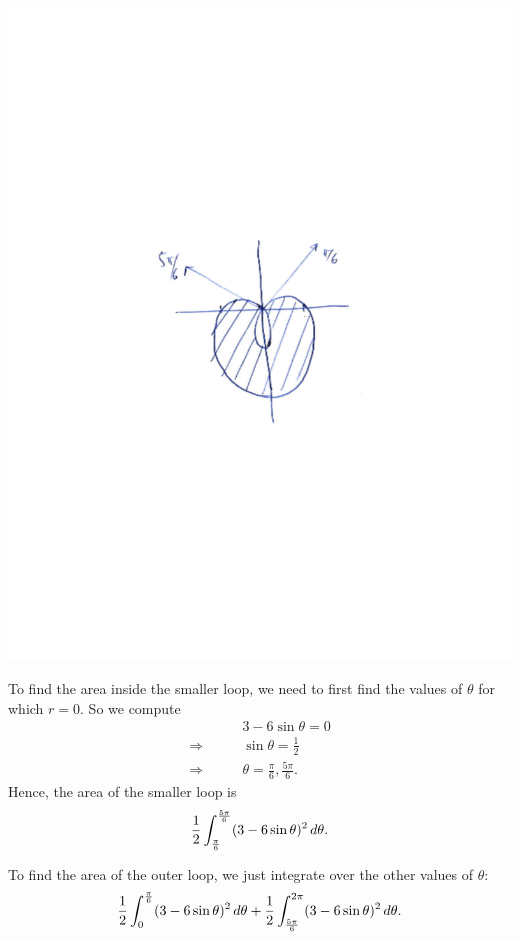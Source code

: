 \documentclass[]{ximera}
\begin{document}
\begin{problem}
\begin{freeResponse}
\begin{enumerate}
		\begin{image}
		\includegraphics[trim= 280 280 170 280, scale=0.6]{Figure11-3-2.pdf}
		\end{image}
		
	To find the area inside the smaller loop, we need to first find the values of $\theta$ for which $r = 0$.
	So we compute
		\begin{align*}
		&3 - 6 \sin \theta = 0  \\
		\Longrightarrow \qquad &\sin \theta = \frac{1}{2}  \\
		\Longrightarrow \qquad &\theta = \frac{\pi}{6}, \frac{5 \pi}{6}.
		\end{align*}
	Hence, the area of the smaller loop is
		\[
		\frac{1}{2} \int_{\frac{\pi}{6}}^{\frac{5 \pi}{6}} (3 - 6 \sin \theta)^2 \,d \theta.
		\]
		
	To find the area of the outer loop, we just integrate over the other values of $\theta$:
		\[
		\frac{1}{2} \int_0^{\frac{\pi}{6}} (3 - 6 \sin \theta)^2 \,d \theta
		+ \frac{1}{2} \int_{\frac{5 \pi}{6}}^{2 \pi} (3 - 6 \sin \theta)^2 \,d \theta.
		\]
		

\end{enumerate}
\end{freeResponse}
\end{problem}
\end{document}
